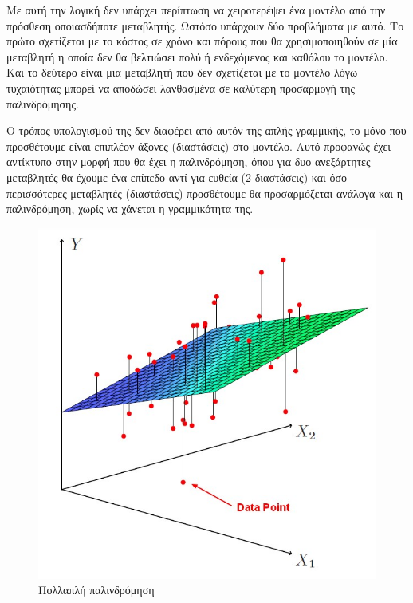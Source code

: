 Με αυτή την λογική δεν υπάρχει περίπτωση να χειροτερέψει ένα μοντέλο από την
πρόσθεση οποιασδήποτε μεταβλητής. Ωστόσο υπάρχουν δύο προβλήματα με αυτό. Το
πρώτο σχετίζεται με το κόστος σε χρόνο και πόρους που θα χρησιμοποιηθούν σε μία
μεταβλητή η οποία δεν θα βελτιώσει πολύ ή ενδεχόμενος και καθόλου το μοντέλο. Και το
δεύτερο είναι μια μεταβλητή που δεν σχετίζεται με το μοντέλο λόγω τυχαιότητας μπορεί να
αποδώσει λανθασμένα σε καλύτερη προσαρμογή της παλινδρόμησης.

Ο τρόπος
υπολογισμού της δεν διαφέρει από αυτόν της απλής γραμμικής, το μόνο που προσθέτουμε
είναι επιπλέον άξονες (διαστάσεις) στο μοντέλο. Αυτό προφανώς έχει αντίκτυπο στην μορφή
που θα έχει η παλινδρόμηση, όπου για δυο ανεξάρτητες μεταβλητές θα έχουμε ένα επίπεδο
αντί για ευθεία (2 διαστάσεις) και όσο περισσότερες μεταβλητές (διαστάσεις) προσθέτουμε
θα προσαρμόζεται ανάλογα και η παλινδρόμηση, χωρίς να χάνεται η γραμμικότητα της.

\begin{figure}[H]
    \centering
    \includegraphics[width=1\textwidth]{images/Multiple regression.jpg}
    \caption{Πολλαπλή παλινδρόμηση}
\end{figure}

